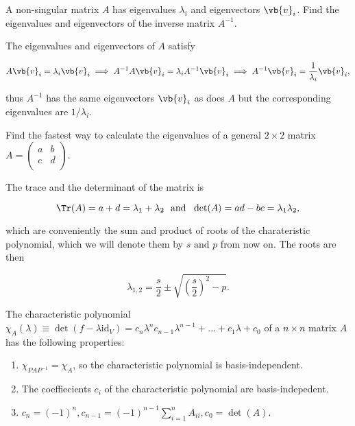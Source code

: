 \documentclass[a4paper,12pt]{report}
\begin{document}
{A non-singular matrix \(A\) has eigenvalues \(\lambda _{i} \) and eigenvectors \(\vb{v} _{i} \). Find the eigenvalues and eigenvectors of the inverse matrix \(A^{-1} \).   }
{The eigenvalues and eigenvectors of \(A\) satisfy

\begin{equation}
    A \vb{v} _{i} = \lambda _{i}\vb{v} _{i} \implies A^{-1} A \vb{v} _{i} = \lambda _{i}A^{-1} \vb{v} _{i} \implies A^{-1} \vb{v} _{i} = \frac{1}{\lambda _{i} }\vb{v} _{i},    
\end{equation}

thus \(A^{-1} \) has the same eigenvectors \(\vb{v} _{i} \) as does \(A\) but the corresponding eigenvalues are \(1 /\lambda _{i} \).   
} 

{Find the fastest way to calculate the eigenvalues of a general \(2 \times 2\) matrix \(A = \begin{pmatrix}
    a &  b \\
    c &  d \\
\end{pmatrix}.\) }
{The trace and the determinant of the matrix is 

\begin{equation}
    \Tr (A) = a+d = \lambda _{1}+\lambda _{2} ~\text { and }~ \det (A) = ad - bc  = \lambda _{1}\lambda _{2},  
\end{equation}

which are conveniently the sum and product of roots of the charateristic polynomial, which we will denote them by \(s \text { and } p\) from now on. The roots are then 

\begin{equation}
    \lambda _{1,2} = \frac{s}{2} \pm \sqrt{\left( \frac{s}{2}  \right)^2 - p }.   
\end{equation}
} 

\begin{lemma}
The characteristic polynomial \(\chi _{A}(\lambda ) \equiv \det (f-\lambda \mathrm{id}_{V} ) = c_{n}\lambda ^{n} c_{n-1}\lambda ^{n-1} + \ldots + c_1 \lambda +c_0 \) of a \(n \times n\) matrix \(A\) has the following properties:

\begin{enumerate}[label=(\(O\)\arabic*)]
    \item \(\chi _{PAP^{-1} } = \chi _{A}  \), so the characteristic polynomial is basis-independent. \label{O1} 
    \item The coeffiecients \(c_{i} \) of the characteristic polynomial are basis-indepedent.
    \item \(c_{n} = (-1)^{n}, c_{n-1} = (-1)^{n-1}\sum_{i=1}^{n} A_{ii}, c_0 = \det (A)\).    
\end{enumerate}

\end{lemma}
\end{document}
